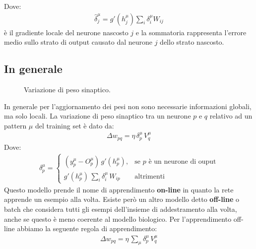 	Dove:
	\begin{align*}
		\hat{\delta}_j^\mu = g'(h_j^\mu) \sum_i \delta^\mu_i W_{ij}
	\end{align*}
	è il gradiente locale del neurone nascosto $j$ e la sommatoria rappresenta l'errore medio sullo strato di output causato dal neurone $j$ dello strato nascosto.

	\newpage

	\subsection{In generale} %
	\label{ssub:in_generale}
	\begin{figure}[h!]
		\centering
		\caption{Variazione di peso sinaptico.}
	\end{figure}

	In generale per l'aggiornamento dei pesi non sono necessarie informazioni globali, ma solo locali. La variazione di peso sinaptico tra un neurone $p$ e $q$ relativo ad un pattern $\mu$ del training set è dato da:
	\begin{align}
		\Delta w_{pq} = \eta \, \delta^\mu_p \, V^\mu_q
	\end{align}
	Dove:
	\begin{align*}
		\delta_p^\mu =
		\begin{cases}
			(y^\mu_p - O^\mu_p) \, g'(h^\mu_p), &\text{se $p$ è un neurone di ouput} \\
			\displaystyle g'(h_p^\mu) \, \sum_i \delta^\mu_i \, W_{ip} &\text{altrimenti}
		\end{cases}
	\end{align*}
	Questo modello prende il nome di apprendimento \textbf{on-line} in quanto la rete apprende un esempio alla volta. Esiste però un altro modello detto \textbf{off-line} o batch che considera tutti gli esempi dell'insieme di addestramento alla volta, anche se questo è meno coerente al modello biologico. Per l'apprendimento off-line abbiamo la seguente regola di apprendimento:
	\begin{align}
		\Delta w_{pq} = \eta \, \sum_\mu \delta^\mu_p \, V^\mu_q
	\end{align}

